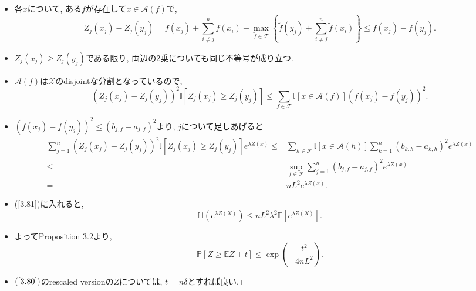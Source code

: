 \documentclass[aspectratio=169, dvipdfmx]{beamer}
\def\qed{\hfill $\Box$}
\newcommand{\ex}{\mathbb{E}}
\newcommand{\bb}{\mathbb}
\newcommand{\cc}{\mathcal}
\begin{document}
\begin{frame}
    \begin{itemize}
        \item 各$x$について, ある$f$が存在して$x \in \cc{A}(f)$で, 
        \[
            Z_{j} (x_{j})-Z_{j}(y_{j})
            = f(x_{j})+\sum_{i \ne j}^{n} f(x_{i})-\max_{\tilde{f} \in \cc{F}}\left\{\tilde{f}(y_{j})+\sum_{i \ne j}^{n} \tilde{f}(x_{i})\right\}
            \leq f\left(x_{j}\right)-f\left(y_{j}\right).
        \]
        \item $Z_j(x_j) \ge Z_j(y_j)$である限り, 両辺の2乗についても同じ不等号が成り立つ.
        \item $\cc{A}(f)$は$\cc{X}$のdisjointな分割となっているので,
        \[
            \left(Z_{j}(x_{j})-Z_{j}(y_{j})\right)^{2} \bb{I}[Z_{j}(x_{j}) \geq Z_{j}(y_{j})]
            \leq \sum_{f \in \cc{F}} \bb{I}[x \in \mathcal{A}(f)]\left(f\left(x_{j}\right)-f\left(y_{j}\right)\right)^{2}.
            \tag{3.82}\label{3.82}
        \]
    \end{itemize}
\end{frame}

\begin{frame}
\begin{itemize}
    \item $(f(x_j)-f(y_j))^2 \le (b_{j,f}-a_{j,f})^2$より, $j$について足しあげると
    {\small
        \begin{align*}
            \sum_{j=1}^{n}\left(Z_{j}\left(x_{j}\right)-Z_{j}\left(y_{j}\right)\right)^{2} \bb{I}\left[Z_{j}\left(x_{j}\right)\geq Z_{j}\left(y_{j}\right)\right] e^{\lambda Z(x)}
            \leq &\sum_{h \in \cc{F}} \bb{I}[x \in \mathcal{A}(h)] \sum_{k=1}^{n}\left(b_{k, h}-a_{k, h}\right)^{2} e^{\lambda Z(x)} \\
            \leq &\sup _{f \in \cc{F}} \sum_{j=1}^{n}\left(b_{j, f}-a_{j, f}\right)^{2} e^{\lambda Z(x)} \\
            =&n L^{2} e^{\lambda Z(x)} .
        \end{align*}
    }
    \item (\ref{3.81})に入れると,
    \[ \bb{H}(e^{\lambda Z(X)}) \le nL^2\lambda^2\ex[e^{\lambda Z(X)}]. \]
    \item よってProposition 3.2より, 
    \[
        \bb{P}[Z \ge \ex{Z} + t] \le \exp\left(-\frac{t^2}{4nL^2}\right).
    \]
    \item $(\ref{3.80})$のrescaled versionの$Z$については, $t = n\delta$とすれば良い.\qed
\end{itemize}
\end{frame}
\end{document}
